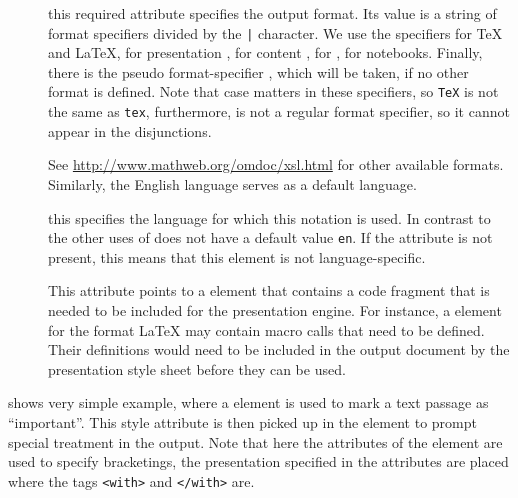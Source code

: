 \begin{description}
\item[{}] this required attribute specifies the output
  format. Its value is a string of format specifiers divided by the {\tt{|}}
  character. We use the specifiers {} for {\TeX} and
  {\LaTeX}, {} for presentation {\mathml},
  {} for content {\mathml}, {}
  for {\html}, {} for {\mathematica} notebooks.
  Finally, there is the pseudo format-specifier {},
  which will be taken, if no other format is defined. Note that case matters in
  these specifiers, so {\tt{TeX}} is not the same as {\tt{tex}}, furthermore,
  {} is not a regular format specifier, so it cannot
  appear in the disjunctions.
  
  See {\url{http://www.mathweb.org/omdoc/xsl.html}} for other available formats.
  Similarly, the English language serves as a default language.
\item[{}] this specifies the language for
  which this notation is used. In contrast to the other uses of
  {} does not have a default value {\tt{en}}.
  If the attribute is not present, this means that this element is not
  language-specific.
\item[{}] This attribute points to a {}
  element that contains a code fragment that is needed to be included for the
  presentation engine. For instance, a {} element for the format
  {\LaTeX} may contain macro calls that need to be defined. Their definitions
  would need to be included in the output document by the presentation style sheet
  before they can be used.
\end{description}

{} shows very simple example, where a {} element is
used to mark a text passage as ``important''. This style attribute is then picked
up in the {} element to prompt special treatment in the output.
Note that here the attributes of the {} element are used to specify
bracketings, the presentation specified in the attributes are placed where the
{\xml} tags {\tt{<with>}} and {\tt{</with>}} are.

